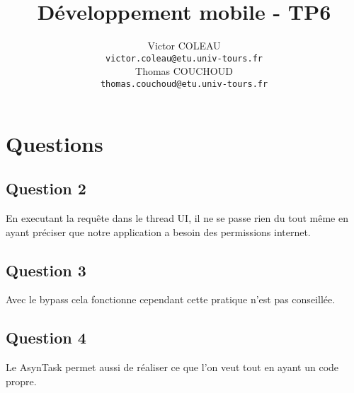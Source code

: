 \documentclass{report}
\title{Développement mobile - TP6}
\author{Victor COLEAU\\\texttt{victor.coleau@etu.univ-tours.fr}\\Thomas COUCHOUD\\\texttt{thomas.couchoud@etu.univ-tours.fr}}
\begin{document}
	\mccTitle
	\tableofcontents
	\chapter{Questions}
		\section{Question 2}
			En executant la requête dans le thread UI, il ne se passe rien du tout même en ayant préciser que notre application a besoin des permissions internet.
			
		\section{Question 3}
			Avec le bypass cela fonctionne cependant cette pratique n'est pas conseillée.
			
		\section{Question 4}
			Le AsynTask permet aussi de réaliser ce que l'on veut tout en ayant un code propre.
\end{document}
